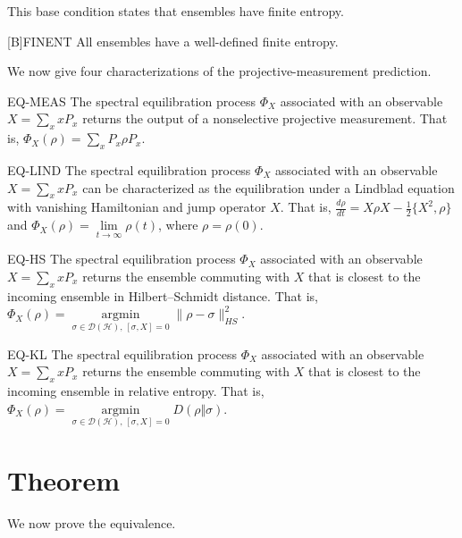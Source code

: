 \documentclass{techbrief}
\begin{document}
This base condition states that ensembles have finite entropy.
\begin{condition}{[B]FINENT}
	All ensembles have a well-defined finite entropy.
\end{condition}

We now give four characterizations of the projective-measurement prediction.
\begin{condition}{EQ-MEAS}
	The spectral equilibration process $\Phi_X$ associated with an observable $X=\sum_x xP_x$ returns the output of a nonselective projective measurement. That is, $\Phi_X(\rho)=\sum_x P_x \rho P_x$.
\end{condition}

\begin{condition}{EQ-LIND}
	The spectral equilibration process $\Phi_X$ associated with an observable $X=\sum_x xP_x$ can be characterized as the equilibration under a Lindblad equation with vanishing Hamiltonian and jump operator $X$. That is, $\frac{d\rho}{dt}=X\rho X-\frac{1}{2}\{X^2,\rho\}$ and $\Phi_X(\rho)=\lim\limits_{t\to\infty}\rho(t)$, where $\rho = \rho(0)$.
\end{condition}

\begin{condition}{EQ-HS}
	The spectral equilibration process $\Phi_X$ associated with an observable $X=\sum_x xP_x$ returns the ensemble commuting with $X$ that is closest to the incoming ensemble in Hilbert--Schmidt distance. That is, $\Phi_X(\rho)=\operatorname*{argmin}\limits_{\sigma\in\mathcal D(\mathcal H),\,[\sigma,X]=0}\|\rho-\sigma\|^2_{HS}$.
\end{condition}

\begin{condition}{EQ-KL}
	The spectral equilibration process $\Phi_X$ associated with an observable $X=\sum_x xP_x$ returns the ensemble commuting with $X$ that is closest to the incoming ensemble in relative entropy. That is, $\Phi_X(\rho)=\operatorname*{argmin}\limits_{\sigma\in\mathcal D(\mathcal H),\,[\sigma,X]=0}D(\rho\Vert\sigma)$.
\end{condition}

\section{Theorem}

We now prove the equivalence.
\end{document}

